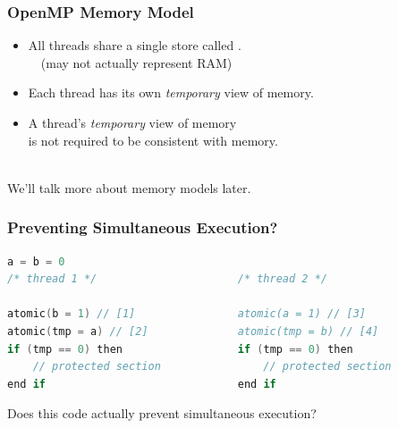\begin{frame}
  \frametitle{OpenMP Memory Model}

  \begin{changemargin}{1cm}
\large

  \begin{itemize}
    \item All threads share a single store called
      .\\ ~~(may not actually represent RAM)\\[1em]
    \item Each thread has its own {\it temporary} view of memory.\\[1em]
    \item A thread's {\it temporary} view of memory\\ is not required to be
      consistent with memory.
  \end{itemize}~\\

  We'll talk more about memory models later.
  \end{changemargin}
  
\end{frame}

\begin{frame}[fragile]
  \frametitle{Preventing Simultaneous Execution?}

  \begin{lstlisting}[language=C,morekeywords={foreach,pragma,omp,parallel,single,nowait,task,untied,barrier,taskyield,mergeable,final,taskwait,critical}]
                    a = b = 0
/* thread 1 */                      /* thread 2 */

atomic(b = 1) // [1]                atomic(a = 1) // [3]
atomic(tmp = a) // [2]              atomic(tmp = b) // [4]
if (tmp == 0) then                  if (tmp == 0) then
    // protected section                // protected section
end if                              end if
  \end{lstlisting}


\large
 Does this code actually prevent simultaneous execution?

  
\end{frame}


